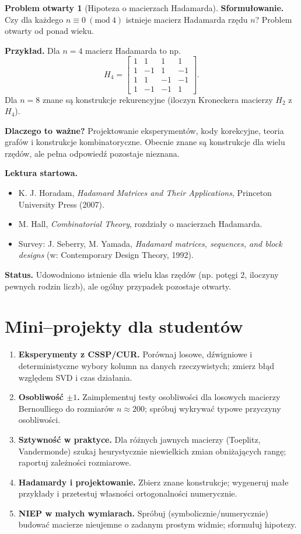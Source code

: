 \documentclass[11pt,a4paper]{article}
\theoremstyle{definition}
\newtheorem{openproblem}{Problem otwarty}
\begin{document}
\begin{openproblem}[Hipoteza o macierzach Hadamarda]\label{prob:Hadamard}
\textbf{Sformułowanie.} Czy dla każdego \(n\equiv 0\ (\mathrm{mod}\ 4)\) istnieje macierz Hadamarda rzędu \(n\)? Problem otwarty od ponad wieku.

\textbf{Przykład.} Dla \(n=4\) macierz Hadamarda to np.
\[
H_4 = \begin{bmatrix}
  1 &  1 &  1 &  1 \\
  1 & -1 &  1 & -1 \\
  1 &  1 & -1 & -1 \\
  1 & -1 & -1 &  1
\end{bmatrix}.
\]
Dla \(n=8\) znane są konstrukcje rekurencyjne (iloczyn Kroneckera macierzy \(H_2\) z \(H_4\)).

\textbf{Dlaczego to ważne?} Projektowanie eksperymentów, kody korekcyjne, teoria grafów i konstrukcje kombinatoryczne. Obecnie znane są konstrukcje dla wielu rzędów, ale pełna odpowiedź pozostaje nieznana.

\textbf{Lektura startowa.}
\begin{itemize}
  \item K. J. Horadam, \emph{Hadamard Matrices and Their Applications}, Princeton University Press (2007).
  \item M. Hall, \emph{Combinatorial Theory}, rozdziały o macierzach Hadamarda.
  \item Survey: J. Seberry, M. Yamada, \emph{Hadamard matrices, sequences, and block designs} (w: Contemporary Design Theory, 1992).
\end{itemize}

\textbf{Status.} Udowodniono istnienie dla wielu klas rzędów (np. potęgi 2, iloczyny pewnych rodzin liczb), ale ogólny przypadek pozostaje otwarty.
\end{openproblem}


\section*{Mini–projekty dla studentów}
\begin{enumerate}[label=\textbf{P\arabic*}., leftmargin=8mm]
  \item \textbf{Eksperymenty z CSSP/CUR.} Porównaj losowe, dźwigniowe i deterministyczne wybory kolumn na danych rzeczywistych; zmierz błąd względem SVD i czas działania.
  \item \textbf{Osobliwość \(\pm1\).} Zaimplementuj testy osobliwości dla losowych macierzy Bernoulliego do rozmiarów \(n\approx 200\); spróbuj wykrywać typowe przyczyny osobliwości.
  \item \textbf{Sztywność w praktyce.} Dla różnych jawnych macierzy (Toeplitz, Vandermonde) szukaj heurystycznie niewielkich zmian obniżających rangę; raportuj zależności rozmiarowe.
  \item \textbf{Hadamardy i projektowanie.} Zbierz znane konstrukcje; wygeneruj małe przykłady i przetestuj własności ortogonalności numerycznie.
  \item \textbf{NIEP w małych wymiarach.} Spróbuj (symbolicznie/numerycznie) budować macierze nieujemne o zadanym prostym widmie; sformułuj hipotezy.
\end{enumerate}
\end{document}

